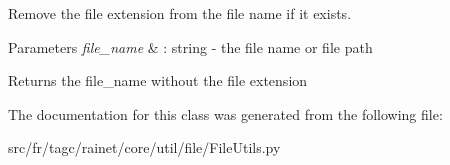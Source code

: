 Remove the file extension from the file name if it exists. 


\begin{DoxyParams}{Parameters}
{\em file\-\_\-name} & \-: string -\/ the file name or file path\\
\hline
\end{DoxyParams}
\begin{DoxyReturn}{Returns}
the file\-\_\-name without the file extension 
\end{DoxyReturn}


The documentation for this class was generated from the following file\-:\begin{DoxyCompactItemize}
\item 
src/fr/tagc/rainet/core/util/file/File\-Utils.\-py\end{DoxyCompactItemize}
